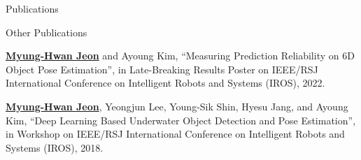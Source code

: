 \begin{rSection}{Publications}
\begin{pubSubsection}{Other Publications}
  \item \underline{\textbf{Myung-Hwan Jeon}} and Ayoung Kim, “Measuring Prediction Reliability on 6D Object Pose Estimation”, in Late-Breaking Results Poster on IEEE/RSJ International Conference on Intelligent Robots and Systems (IROS), 2022.  

  \item \underline{\textbf{Myung-Hwan Jeon}}, Yeongjun Lee, Young-Sik Shin, Hyesu Jang, and Ayoung Kim, “Deep Learning Based Underwater Object Detection and Pose Estimation”, in Workshop on IEEE/RSJ International Conference on Intelligent Robots and Systems (IROS), 2018.

\end{pubSubsection} 





\end{rSection}

